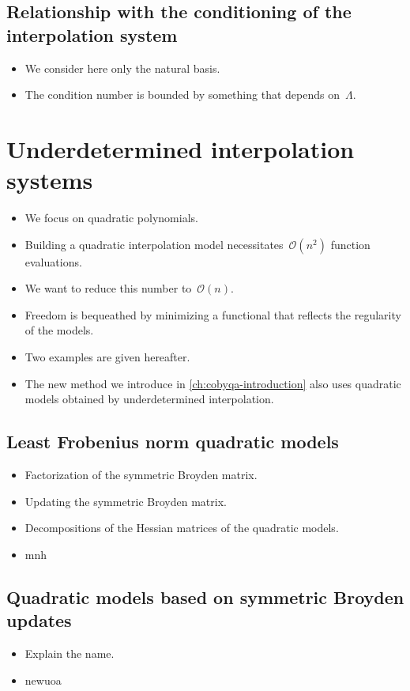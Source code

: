 \subsection{Relationship with the conditioning of the interpolation system}

\begin{itemize}
    \item We consider here only the natural basis.
    \item The condition number is bounded by something that depends on~$\Lambda$.
\end{itemize}

\section{Underdetermined interpolation systems}
\label{sec:underdetermined-interpolation}

\begin{itemize}
    \item We focus on quadratic polynomials.
    \item Building a quadratic interpolation model necessitates~$\mathcal{O}(n^2)$ function evaluations.
    \item We want to reduce this number to~$\mathcal{O}(n)$.
    \item Freedom is bequeathed by minimizing a functional that reflects the regularity of the models.
    \item Two examples are given hereafter.
    \item The new method we introduce in \cref{ch:cobyqa-introduction} also uses quadratic models obtained by underdetermined interpolation.
\end{itemize}

\subsection{Least Frobenius norm quadratic models}

\begin{itemize}
    \item Factorization of the symmetric Broyden matrix.
    \item Updating the symmetric Broyden matrix.
    \item Decompositions of the Hessian matrices of the quadratic models.
    \item \gls{mnh}~\cite{Wild_2008}
\end{itemize}

\subsection{Quadratic models based on symmetric Broyden updates}
\label{subsec:symmetric-broyden-updates}

\begin{itemize}
    \item Explain the name.
    \item \gls{newuoa}~\cite{Powell_2006}
\end{itemize}
